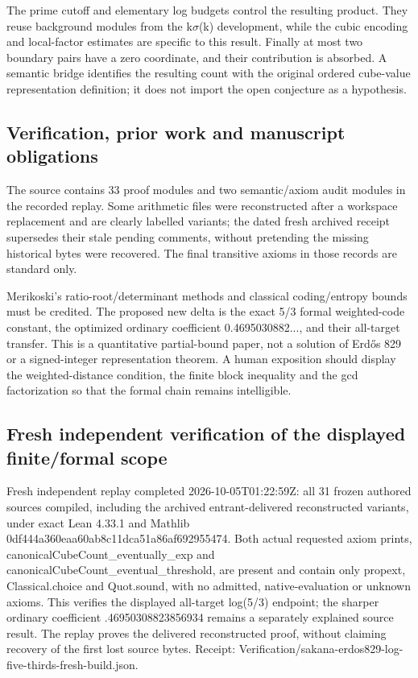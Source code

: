 \documentclass[11pt,a4paper]{article}
\begin{document}
The prime cutoff and elementary log budgets control the resulting product. They reuse background modules from the k\ensuremath{\sigma}(k) development, while the cubic encoding and local-factor estimates are specific to this result. Finally at most two boundary pairs have a zero coordinate, and their contribution is absorbed. A semantic bridge identifies the resulting count with the original ordered cube-value representation definition; it does not import the open conjecture as a hypothesis.

\subsection{Verification, prior work and manuscript obligations}
The source contains 33 proof modules and two semantic/axiom audit modules in the recorded replay. Some arithmetic files were reconstructed after a workspace replacement and are clearly labelled variants; the dated fresh archived receipt supersedes their stale pending comments, without pretending the missing historical bytes were recovered. The final transitive axioms in those records are standard only.

Merikoski's ratio-root/determinant methods and classical coding/entropy bounds must be credited. The proposed new delta is the exact 5/3 formal weighted-code constant, the optimized ordinary coefficient 0.4695030882..., and their all-target transfer. This is a quantitative partial-bound paper, not a solution of Erdős 829 or a signed-integer representation theorem. A human exposition should display the weighted-distance condition, the finite block inequality and the gcd factorization so that the formal chain remains intelligible.

\subsection{Fresh independent verification of the displayed finite/formal scope}
Fresh independent replay completed 2026-10-05T01:22:59Z: all 31 frozen authored sources compiled, including the archived entrant-delivered reconstructed variants, under exact Lean 4.33.1 and Mathlib 0df444a360eaa60ab8c11dca51a86af692955474. Both actual requested axiom prints, canonicalCubeCount\_eventually\_exp and canonicalCubeCount\_eventual\_threshold, are present and contain only propext, Classical.choice and Quot.sound, with no admitted, native-evaluation or unknown axioms. This verifies the displayed all-target log(5/3) endpoint; the sharper ordinary coefficient .46950308823856934 remains a separately explained source result. The replay proves the delivered reconstructed proof, without claiming recovery of the first lost source bytes. Receipt: Verification/sakana-erdos829-log-five-thirds-fresh-build.json.
\end{document}
